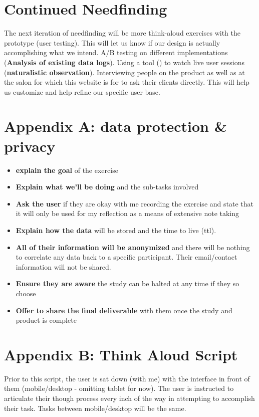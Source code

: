 \section{Continued Needfinding}
The next iteration of needfinding will be more think-aloud exercises with the prototype (user testing). This will let us know if our design is actually accomplishing what we intend. A/B testing on different implementations (\textbf{Analysis of existing data logs}). Using a tool () to watch live user sessions (\textbf{naturalistic observation}). Interviewing people on the product as well as at the salon for which this website is for to ask their clients directly. This will help us customize and help refine our specific user base.


\section{Appendix A: data protection & privacy}

\begin{itemize}
\item
  \textbf{explain the goal} of the exercise
\item
  \textbf{Explain what we'll be doing} and the sub-tasks involved
\item
  \textbf{Ask the user} if they are okay with me recording the exercise and state that it will only be used for my reflection as a means of extensive note taking
\item
  \textbf{Explain how the data} will be stored and the time to live (ttl).
\item
  \textbf{All of their information will be anonymized} and there will be nothing to correlate any data back to a specific participant. Their email/contact information will not be shared.
\item
  \textbf{Ensure they are aware} the study can be halted at any time if they so choose
\item
  \textbf{Offer to share the final deliverable} with them once the study and product is complete
\end{itemize}


\section{Appendix B: Think Aloud Script}
Prior to this script, the user is sat down (with me) with the interface in front of them (mobile/desktop - omitting tablet for now). The user is instructed to articulate their though process every inch of the way in attempting to accomplish their task. Tasks between mobile/desktop will be the same.

